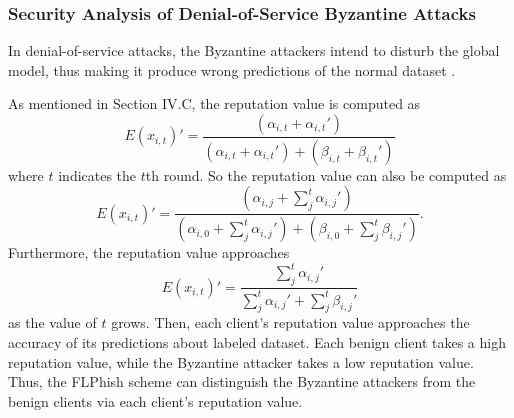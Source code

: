 \documentclass[journal]{IEEEtran}
\begin{document}
\subsubsection{Security Analysis of Denial-of-Service Byzantine Attacks}
\par In denial-of-service attacks, the Byzantine attackers intend to disturb the global model, thus making it produce wrong predictions of the normal dataset \cite{ref_04_model,ref_06_model,ref_07_data,yang2017generative,sun2018data}.
\par As mentioned in Section IV.C, the reputation value is computed as
\begin{equation}
  {E(x_{i,t})}'=\frac{(\alpha_{i,t}+{\alpha_{i,t}}')}{(\alpha_{i,t}+{\alpha_{i,t}}')+(\beta_{i,t}+{\beta_{i,t}}')}
\end{equation}
where $t$ indicates the $t$th round. So the reputation value can also be computed as 
\begin{equation}
  {E(x_{i,t})}'=\frac{(\alpha_{i,j}+\sum_{j}^{t}{\alpha_{i,j}}')}{(\alpha_{i,0}+\sum_{j}^{t} {\alpha_{i,j}}')+(\beta_{i,0}+\sum_{j}^{t}{\beta_{i,j}}')}.
\end{equation}
Furthermore, the reputation value approaches 
\begin{equation}
  {E(x_{i,t})}'=\frac{\sum_{j}^{t}{\alpha_{i,j}}'}{\sum_{j}^{t} {\alpha_{i,j}}'+\sum_{j}^{t}{\beta_{i,j}}'}
\end{equation}
as the value of $t$ grows. Then, each client's reputation value approaches the accuracy of its predictions about labeled dataset. Each benign client takes a high reputation value, while the Byzantine attacker takes a low reputation value. Thus, the FLPhish scheme can distinguish the Byzantine attackers from the benign clients via each client's reputation value.
\end{document}

